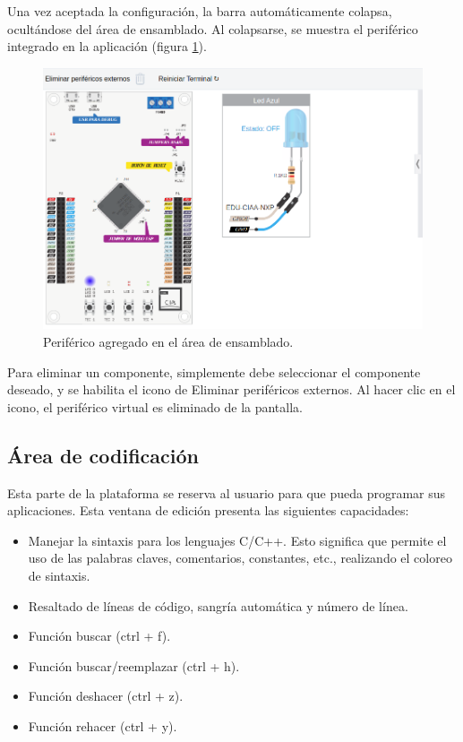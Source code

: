 \newpage

Una vez aceptada la configuración, la barra automáticamente colapsa, ocultándose del área de ensamblado. Al colapsarse, se muestra el periférico integrado en la aplicación (figura \ref{fig:AgregarPeriferico2}). 

\begin{figure}[ht]
	\centering
	\includegraphics[scale=.37]{./Figures/AgregarPeriferico2.png}
	\caption{Periférico agregado en el área de ensamblado. }
	\label{fig:AgregarPeriferico2}
\end{figure}

Para eliminar un componente, simplemente debe seleccionar el componente deseado, y se habilita el icono de \textquotedbl Eliminar periféricos externos\textquotedbl. Al hacer clic en el icono, el periférico virtual es eliminado de la pantalla.

\subsection{Área de codificación}

Esta parte de la plataforma se reserva al usuario para que pueda programar sus aplicaciones. Esta ventana de edición presenta las siguientes capacidades:

\begin{itemize}
\item Manejar la sintaxis para los lenguajes C/C++. Esto significa que permite el uso de las palabras claves, comentarios, constantes, etc., realizando el coloreo de sintaxis.
\item Resaltado de líneas de código, sangría automática y número de línea.
\item Función buscar (ctrl + f).
\item Función buscar/reemplazar (ctrl + h).
\item Función deshacer (ctrl + z).
\item Función rehacer (ctrl + y).
\end{itemize}

